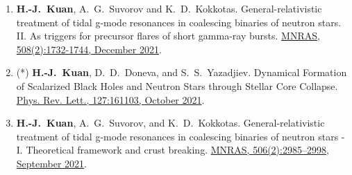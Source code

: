 \documentclass[10pt,floatfix,a4paper]{article}
\begin{document}
\begin{enumerate}
	\item  \textbf{H.-J.~Kuan}, A.~G.~Suvorov and K.~D.~Kokkotas. General-relativistic treatment of tidal g-mode resonances in coalescing binaries of neutron stars. II. As triggers for precursor flares of short gamma-ray bursts. \href{https://doi.org/10.1093/mnras/stab2658}{MNRAS, 508(2):1732-1744, December 2021}.
	\item (*) \textbf{H.-J.~Kuan}, D.~D.~Doneva, and S.~S.~Yazadjiev. Dynamical Formation of Scalarized Black Holes and Neutron Stars through Stellar Core Collapse. \href{https://doi.org/10.1103/PhysRevLett.127.161103}{Phys. Rev. Lett., 127:161103, October 2021}.
	\item \textbf{H.-J.~Kuan}, A.~G.~Suvorov, and K.~D.~Kokkotas. General-relativistic treatment of tidal g-mode resonances in coalescing binaries of neutron stars - I. Theoretical framework and crust breaking. \href{https://doi.org/10.1093/mnras/stab1898}{MNRAS, 506(2):2985–2998, September 2021}.
\end{enumerate}
\end{document}
